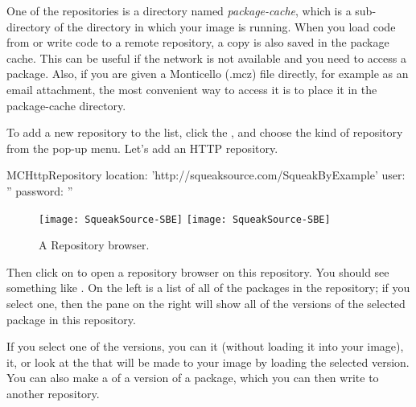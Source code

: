 \documentclass[a4paper,10pt,twoside]{book}
\begin{document}
One of the repositories is a directory named \emph{package-cache}, which is a sub-directory of the directory in which your image is running.  
When you load code from or write code to a remote repository, a copy is also saved in the package cache.  This can be useful if the network is not available and you need to access a package.  Also, if you are given a Monticello (.mcz) file directly, for example as an email attachment, the most convenient way to access it is to place it in the package-cache directory.

To add a new repository to the list, click the , and choose the kind of repository from the pop-up menu.  Let's add an HTTP repository.

\begin{code}{}
MCHttpRepository
	location: 'http://squeaksource.com/SqueakByExample'
	user: ''
	password: ''
\end{code}

\begin{figure}[btp]
	\begin{center}
	\ifluluelse
		{\texttt{[image: SqueakSource-SBE]}}
		{\texttt{[image: SqueakSource-SBE]}}
	\end{center}
	\caption{A Repository browser.}
	\label{fig:SqueakSource:SBE}
\end{figure}
\noindent
Then click on  to open a repository browser on this repository.  You should see something like .  On the left is a list of all of the packages in the repository; if you select one, then the pane on the right will show all of the versions of the selected package in this repository. 

If you select one of the versions, you can  it (without loading it into your image),  it, or look at the  that will be made to your image by loading the selected version.  You can also make a  of a version of a package, which you can then write to another repository.
\end{document}

